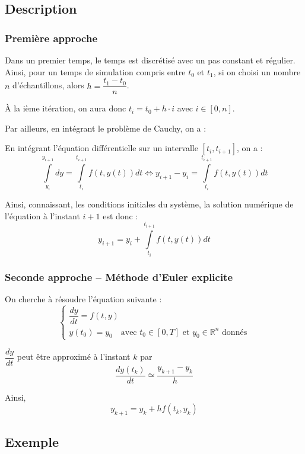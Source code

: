 \documentclass[10pt,fleqn]{article} %
\begin{document}
\subsection{Description}

\subsubsection{Première approche}
Dans un premier temps, le temps est discrétisé avec un pas constant et régulier. Ainsi, pour un temps de simulation compris entre $t_0$ et $t_1$, si on choisi un nombre $n$ d'échantillons, alors  $h=\dfrac{t_1-t_0}{n}$.

 À la ième itération, on aura donc $t_i = t_0+h\cdot i$ avec $i\in[0,n]$.
 
Par ailleurs, en intégrant le problème de Cauchy, on a : 

En intégrant l'équation différentielle sur un intervalle $[t_i, t_{i+1}]$, on a : 
$$
\int\limits_{y_i}^{y_{i+1}} dy = \int\limits_{t_i}^{t_{i+1}} f(t,y(t)) dt 
\Longleftrightarrow 
y_{i+1} - y_i = \int\limits_{t_i}^{t_{i+1}} f(t,y(t)) dt 
$$

\begin{resultat}
Ainsi, connaissant, les conditions initiales du système, la solution numérique de l'équation à l'instant $i+1$ est donc : 
$$
y_{i+1}= y_i + \int\limits_{t_i}^{t_{i+1}} f(t,y(t)) dt 
$$
\end{resultat}

\subsubsection{Seconde approche -- Méthode d'Euler explicite}
On cherche à résoudre l'équation suivante :
$$
\left\{
\begin{array}{l}
\dfrac{dy}{dt}=f(t,y) \\
y(t_0)=y_0 \quad \text{avec } t_0\in [0,T] \text{ et } y_0\in \mathbb{R}^n \text{ donnés}
\end{array}
\right.
 $$ 

$\dfrac{dy}{dt}$ peut être approximé à l'instant $k$ par 
$$
\dfrac{dy(t_k)}{dt} \simeq \dfrac{y_{k+1}-y_k}{h}
$$

Ainsi,
$$
y_{k+1} = y_k +h  f(t_k,y_k)
$$

\subsection{Exemple}
%
%
%
%
\end{document}
